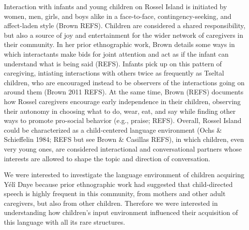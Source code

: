 \documentclass[,man,floatsintext]{apa6}
\begin{document}
Interaction with infants and young children on Rossel Island is
initiated by women, men, girls, and boys alike in a face-to-face,
contingency-seeking, and affect-laden style (Brown REFS). Children are
considered a shared responsibility, but also a source of joy and
entertainment for the wider network of caregivers in their community. In
her prior ethnographic work, Brown details some ways in which
interactants make bids for joint attention and act as if the infant can
understand what is being said (REFS). Infants pick up on this pattern of
caregiving, intiating interactions with others twice as frequently as
Tseltal children, who are encouraged instead to be observers of the
interactions going on around them (Brown 2011 REFS). At the same time,
Brown (REFS) documents how Rossel caregivers encourage early
independence in their children, observing their autonomy in choosing
what to do, wear, eat, and say while finding other ways to promote
pro-social behavior (e.g., praise; REFS). Overall, Rossel Island could
be characterized as a child-centered language environment (Ochs \&
Schieffelin 1984; REFS but see Brown \& Casillas REFS), in which
children, even very young ones, are considered interactional and
conversational partners whose interests are allowed to shape the topic
and direction of conversation.

We were interested to investigate the language environment of children
acquiring Yélî Dnye because prior ethnographic work had suggested that
child-directed speech is highly frequent in this community, from mothers
and other adult caregivers, but also from other children. Therefore we
were interested in understanding how children's input environment
influenced their acquisition of this language with all its rare
structures.
\end{document}
